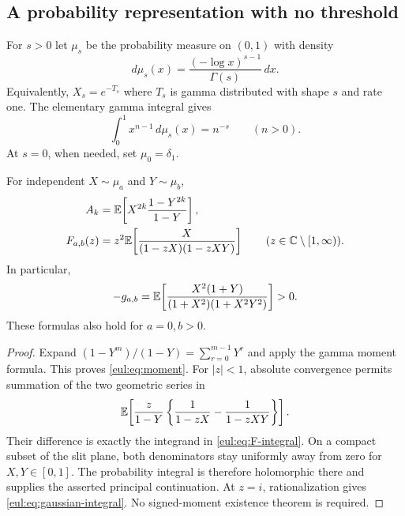 \subsection{A probability representation with no threshold}

For $s>0$ let $\mu_s$ be the probability measure on $(0,1)$ with density
\begin{equation}\label{eul:eq:mu}
 d\mu_s(x)=\frac{(-\log x)^{s-1}}{\Gamma(s)}\,dx.
\end{equation}
Equivalently, $X_s=e^{-T_s}$ where $T_s$ is gamma distributed with
shape $s$ and rate one. The elementary gamma integral gives
\[
 \int_0^1x^{n-1}\,d\mu_s(x)=n^{-s}\qquad(n>0).
\]
At $s=0$, when needed, set $\mu_0=\delta_1$.

\begin{lemma}\label{eul:lem:positive}
For independent $X\sim\mu_a$ and $Y\sim\mu_b$,
\begin{align}
 A_k&=\mathbb E\!\left[X^{2k}\frac{1-Y^{2k}}{1-Y}\right],\label{eul:eq:moment}\\
 F_{a,b}(z)&=z^2\mathbb E\!\left[
       \frac{X}{(1-zX)(1-zXY)}\right]
       \qquad(z\in\mathbb C\setminus[1,\infty)).\label{eul:eq:F-integral}
\end{align}
In particular,
\begin{equation}\label{eul:eq:gaussian-integral}
 -g_{a,b}=\mathbb E\!\left[
 \frac{X^2(1+Y)}{(1+X^2)(1+X^2Y^2)}\right]>0.
\end{equation}
These formulas also hold for $a=0,b>0$.
\end{lemma}
\begin{proof}
Expand $(1-Y^m)/(1-Y)=\sum_{r=0}^{m-1}Y^r$ and apply the gamma
moment formula. This proves \eqref{eul:eq:moment}. For $|z|<1$, absolute
convergence permits summation of the two geometric series in
\[
 \mathbb E\!\left[\frac{z}{1-Y}
     \left\{\frac1{1-zX}-\frac1{1-zXY}\right\}\right].
\]
Their difference is exactly the integrand in \eqref{eul:eq:F-integral}.
On a compact subset of the slit plane, both denominators stay uniformly
away from zero for $X,Y\in[0,1]$. The probability integral is therefore
holomorphic there and supplies the asserted principal continuation.
At $z=i$, rationalization gives \eqref{eul:eq:gaussian-integral}.
No signed-moment existence theorem is required.
\end{proof}

